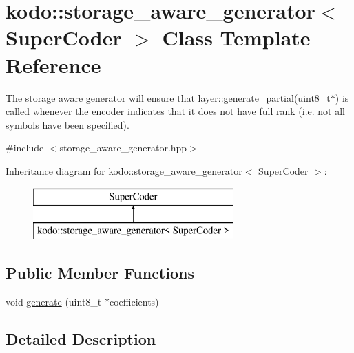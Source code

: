 \hypertarget{classkodo_1_1storage__aware__generator}{\section{kodo\-:\-:storage\-\_\-aware\-\_\-generator$<$ Super\-Coder $>$ Class Template Reference}
\label{classkodo_1_1storage__aware__generator}
}


The storage aware generator will ensure that \hyperlink{group__coefficient__generator__api_ga295e2fc5a74a92ef2281549a31379ba5}{layer\-::generate\-\_\-partial(uint8\-\_\-t$\ast$)} is called whenever the encoder indicates that it does not have full rank (i.\-e. not all symbols have been specified).  




{\ttfamily \#include $<$storage\-\_\-aware\-\_\-generator.\-hpp$>$}

Inheritance diagram for kodo\-:\-:storage\-\_\-aware\-\_\-generator$<$ Super\-Coder $>$\-:\begin{figure}[H]
\begin{center}
\leavevmode
\includegraphics[height=2.000000cm]{classkodo_1_1storage__aware__generator}
\end{center}
\end{figure}
\subsection*{Public Member Functions}
\begin{DoxyCompactItemize}
\item 
void \hyperlink{classkodo_1_1storage__aware__generator_ab6053491317f4df80862f69fc75d6552}{generate} (uint8\-\_\-t $\ast$coefficients)
\begin{DoxyCompactList}\small\item\em \end{DoxyCompactList}\end{DoxyCompactItemize}


\subsection{Detailed Description}
